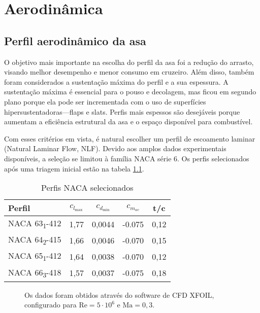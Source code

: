 \chapter{Aerodinâmica}
\section{Perfil aerodinâmico da asa}
\label{perfilasa}

O objetivo mais importante na escolha do perfil da asa foi a redução do arrasto, visando melhor desempenho e menor consumo em cruzeiro. Além disso, também foram considerados a sustentação máxima do perfil e a sua espessura. A sustentação máxima é essencial para o pouso e decolagem, mas ficou em segundo plano porque ela pode ser incrementada com o uso de superfícies hipersustentadoras---flaps e slats. Perfis mais espessos são desejáveis porque aumentam a eficiência estrutural da asa e o espaço disponível para combustível.

Com esses critérios em vista, é natural escolher um perfil de escoamento laminar (Natural Laminar Flow, NLF). Devido aos amplos dados experimentais disponíveis, a seleção se limitou à família NACA série 6. Os perfis selecionados após uma triagem inicial estão na tabela \ref{tbl:perfisNACASelecionados}.

\begin{table}[h]
  \label{tbl:perfisNACASelecionados}
  \caption{Perfis NACA selecionados}
  \centering
  \begin{tabular}{lcccc}
    \toprule
    Perfil &
    $ c_{l_{\max}} $ & $ c_{d_{\min}} $ & $ c_{m_{ac}} $ & t/c \\
    \midrule
    NACA 63\textsubscript{1}-412 & 1,77 &0,0044 & -0.075 & 0,12 \\
    NACA 64\textsubscript{2}-415 & 1,66 &0,0046 & -0.070 & 0,15 \\
    NACA 65\textsubscript{1}-412 & 1,64 &0,0038 & -0.070 & 0,12 \\
    NACA 66\textsubscript{3}-418 & 1,57 &0,0037 & -0.075 & 0,18 \\
    \bottomrule
  \end{tabular}
\end{table}

\begin{figure}[p]
    
    \caption[Coeficientes Aerodinâmicos dos Perfis Selecionados]{Os dados foram
    obtidos através do software de CFD XFOIL\cite{xfoil}, configurado
    para $\text{Re} = 5\cdot10^6$ e $\text{Ma} =0,3$.}
    \label{fig:aero_coef}
\end{figure}

